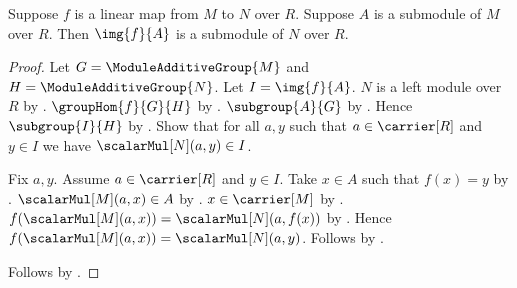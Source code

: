 \begin{theorem}\label{linear_map_submodule_image}
    Suppose $f$ is a linear map from $M$ to $N$ over $R$.
    Suppose $A$ is a submodule of $M$ over $R$.
    Then $\img{f}{A}$ is a submodule of $N$ over $R$.
\end{theorem}
\begin{proof}
    Let $G=\ModuleAdditiveGroup{M}$ and
        $H=\ModuleAdditiveGroup{N}$.
    Let $I=\img{f}{A}$.
    $N$ is a left module over $R$ by
        .
    $\groupHom{f}{G}{H}$ by
        .
    $\subgroup{A}{G}$ by .
    Hence $\subgroup{I}{H}$ by
        .
    Show that for all $a,y$ such that $a\in\carrier[R]$ and $y\in I$
        we have $\scalarMul[N](a,y)\in I$.
    \begin{subproof}
        Fix $a,y$.
        Assume $a\in\carrier[R]$ and $y\in I$.
        Take $x\in A$ such that $f(x)=y$ by
            .
        $\scalarMul[M](a,x)\in A$ by .
        $x\in\carrier[M]$ by .
        $f(\scalarMul[M](a,x))=\scalarMul[N](a,f(x))$ by
            .
        Hence $f(\scalarMul[M](a,x))=\scalarMul[N](a,y)$.
        Follows by
            .
    \end{subproof}
    Follows by .
\end{proof}

